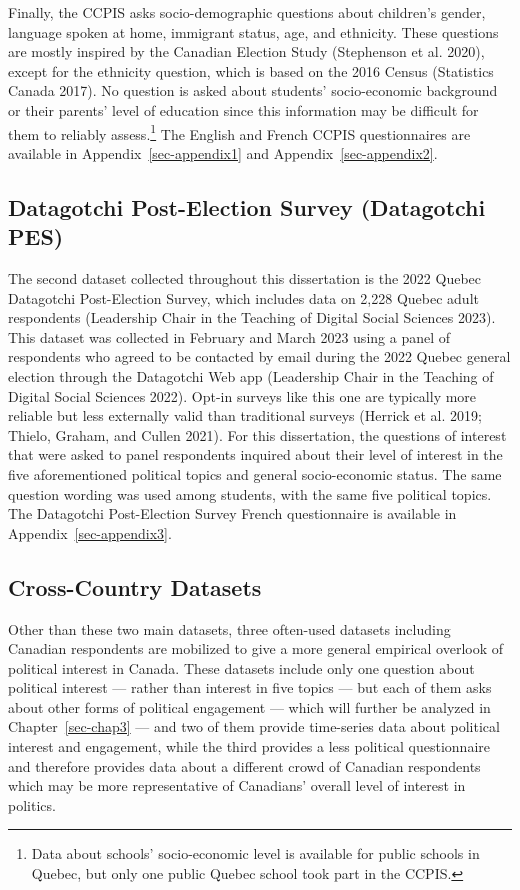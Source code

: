 \documentclass[
  letterpaper,
  DIV=11,
  numbers=noendperiod]{scrreprt}
\begin{document}
Finally, the CCPIS asks socio-demographic questions about children's
gender, language spoken at home, immigrant status, age, and ethnicity.
These questions are mostly inspired by the Canadian Election Study
(Stephenson et al. 2020), except for the ethnicity question, which is
based on the 2016 Census (Statistics Canada 2017). No question is asked
about students' socio-economic background or their parents' level of
education since this information may be difficult for them to reliably
assess.\footnote{Data about schools' socio-economic level is available
  for public schools in Quebec, but only one public Quebec school took
  part in the CCPIS.} The English and French CCPIS questionnaires are
available in Appendix~\ref{sec-appendix1} and
Appendix~\ref{sec-appendix2}.

\subsection{Datagotchi Post-Election Survey (Datagotchi
PES)}\label{datagotchi-post-election-survey-datagotchi-pes}

The second dataset collected throughout this dissertation is the 2022
Quebec Datagotchi Post-Election Survey, which includes data on 2,228
Quebec adult respondents (Leadership Chair in the Teaching of Digital
Social Sciences 2023). This dataset was collected in February and March
2023 using a panel of respondents who agreed to be contacted by email
during the 2022 Quebec general election through the Datagotchi Web app
(Leadership Chair in the Teaching of Digital Social Sciences 2022).
Opt-in surveys like this one are typically more reliable but less
externally valid than traditional surveys (Herrick et al. 2019; Thielo,
Graham, and Cullen 2021). For this dissertation, the questions of
interest that were asked to panel respondents inquired about their level
of interest in the five aforementioned political topics and general
socio-economic status. The same question wording was used among
students, with the same five political topics. The Datagotchi
Post-Election Survey French questionnaire is available in
Appendix~\ref{sec-appendix3}.

\subsection{Cross-Country Datasets}\label{cross-country-datasets}

Other than these two main datasets, three often-used datasets including
Canadian respondents are mobilized to give a more general empirical
overlook of political interest in Canada. These datasets include only
one question about political interest --- rather than interest in five
topics --- but each of them asks about other forms of political
engagement --- which will further be analyzed in Chapter~\ref{sec-chap3}
--- and two of them provide time-series data about political interest
and engagement, while the third provides a less political questionnaire
and therefore provides data about a different crowd of Canadian
respondents which may be more representative of Canadians' overall level
of interest in politics.
\end{document}
